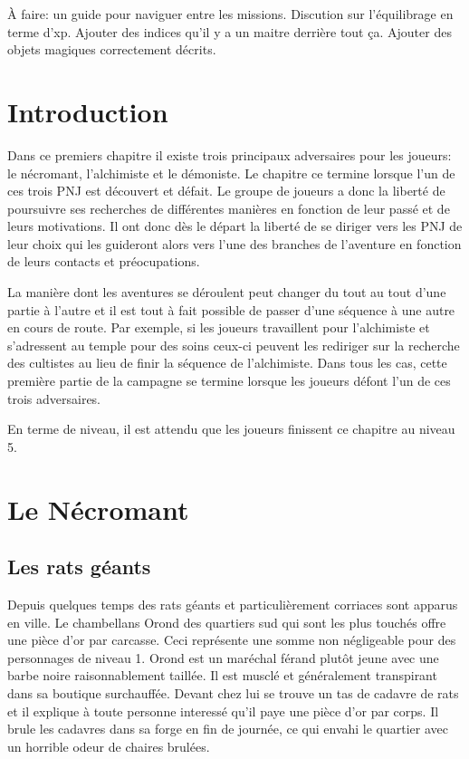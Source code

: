 
À faire: un guide pour naviguer entre les missions.
Discution sur l'équilibrage en terme d'xp.
Ajouter des indices qu'il y a un maitre derrière tout ça.
Ajouter des objets magiques correctement décrits.

\section{Introduction}

Dans ce premiers chapitre il existe trois principaux adversaires pour les joueurs: le nécromant, 
l'alchimiste et le démoniste. Le chapitre ce termine lorsque l'un de ces trois PNJ est découvert et 
défait. Le groupe de joueurs a donc la liberté de poursuivre ses recherches de différentes manières 
en fonction de leur passé et de leurs motivations. Il ont donc dès le départ la liberté de se diriger
vers les PNJ de leur choix qui les guideront alors vers l'une des branches de l'aventure en fonction 
de leurs contacts et préocupations. 

La manière dont les aventures se déroulent peut changer du tout au tout d'une partie à l'autre et il
est tout à fait possible de passer d'une séquence à une autre en cours de route. Par
exemple, si les joueurs travaillent pour l'alchimiste et s'adressent au temple pour des soins ceux-ci 
peuvent les rediriger sur la recherche des cultistes au lieu de finir la séquence de l'alchimiste. Dans 
tous les cas, cette première partie de la campagne se termine lorsque les joueurs défont l'un de ces trois
adversaires.

En terme de niveau, il est attendu que les joueurs finissent ce chapitre au niveau 5.


\section{Le Nécromant}
\subsection{Les rats géants}
\label{ss:RatsGeants}

Depuis quelques temps des rats géants et particulièrement corriaces sont apparus en ville. Le chambellans 
Orond des quartiers sud qui sont les plus touchés offre une pièce d'or par carcasse. Ceci représente une
somme non négligeable pour des personnages de niveau 1. Orond est un maréchal férand plutôt jeune avec une 
barbe noire raisonnablement taillée. Il est musclé et généralement transpirant dans sa boutique surchauffée.
Devant chez lui se trouve un tas de cadavre de rats et il explique à toute personne interessé qu'il paye
une pièce d'or par corps. Il brule les cadavres dans sa forge en fin de journée, ce qui envahi le quartier
avec un horrible odeur de chaires brulées.

